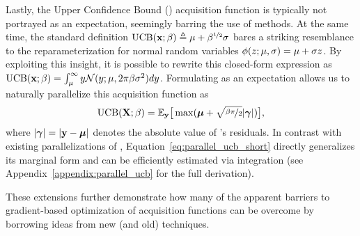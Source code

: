 Lastly, the Upper Confidence Bound (\UCB) acquisition function \cite{srinivas10} is typically not portrayed as an expectation, seemingly barring the use of \MC methods. At the same time, the standard definition \(\operatorname{UCB}(\mathbf{x}; \beta) \triangleq \mu + \beta^{\nicefrac{1}{2}}\sigma\) bares a striking resemblance to the reparameterization for normal random variables \(\phi(z; \mu, \sigma) = \mu + \sigma z\). By exploiting this insight, it is possible to rewrite this closed-form expression as \(\operatorname{UCB}(\mathbf{x}; \beta) = \int_{\mu}^{\infty} y\mathcal{N}(y; \mu, 2\pi\beta\sigma^{2})dy\). Formulating \UCB{} as an expectation allows us to naturally parallelize this acquisition function as 
\begin{align}
	\operatorname{UCB}(\mathbf{X};\beta)
    = \mathbb{E}_{\mathbf{y}}
    \big[
    	\max(\boldsymbol{\mu} + \sqrt{\nicefrac{\beta\pi}{2}}\lvert\boldsymbol{\gamma}\rvert)
	\big],
\label{eq:parallel_ucb_short}
\end{align}
where \(\lvert\boldsymbol{\gamma}\rvert = \lvert\mathbf{y} - \boldsymbol{\mu}\rvert\) denotes the absolute value of \Y{}'s residuals. In contrast with existing parallelizations of \UCB{} \cite{contal2013parallel,desautels2014parallelizing}, Equation~\eqref{eq:parallel_ucb_short} directly generalizes its marginal form and can be efficiently estimated via \MC integration (see Appendix~\ref{appendix:parallel_ucb} for the full derivation).

These extensions further demonstrate how many of the apparent barriers to gradient-based optimization of \MC{} acquisition functions can be overcome by borrowing ideas from new (and old) techniques.